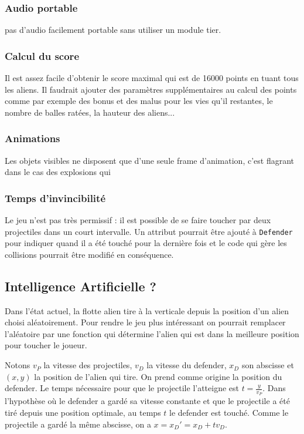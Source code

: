 \documentclass[12pt]{article}
\begin{document}
		\subsubsection{Audio portable}
			pas d'audio facilement portable sans utiliser un module tier. 

		\subsubsection{Calcul du score}
			Il est assez facile d'obtenir le score maximal qui est de 16000 points en tuant tous les aliens. Il faudrait ajouter des paramètres supplémentaires au calcul des points comme par exemple des bonus et des malus pour les vies qu'il restantes, le nombre de balles ratées, la hauteur des aliens...

		\subsubsection{Animations}
			Les objets visibles ne disposent que d'une seule frame d'animation, c'est flagrant dans le cas des explosions qui 

		\subsubsection{Temps d'invincibilité}
			Le jeu n'est pas très permissif : il est possible de se faire toucher par deux projectiles dans un court intervalle. Un attribut pourrait être ajouté à \texttt{Defender} pour indiquer quand il a été touché pour la dernière fois et le code qui gère les collisions pourrait être modifié en conséquence.



	\subsection{Intelligence Artificielle ?}
	Dans l'état actuel, la flotte alien tire à la verticale depuis la position d'un alien choisi aléatoirement. Pour rendre le jeu plus intéressant on pourrait remplacer l'aléatoire par une fonction qui détermine l'alien qui est dans la meilleure position pour toucher le joueur. 

	\par Notons $v_P$ la vitesse des projectiles, $v_D$ la vitesse du defender, $x_D$ son abscisse et $(x,y)$ la position de l'alien qui tire. On prend comme origine la position du defender. Le temps nécessaire pour que le projectile l'atteigne est $ t = \frac{y}{v_P} $. Dans l'hypothèse où le defender a gardé sa vitesse constante et que le projectile a été tiré depuis une position optimale, au temps $t$ le defender est touché. Comme le projectile a gardé la même abscisse, on a $x = x_D' = x_D + t v_D $. 
\end{document}
